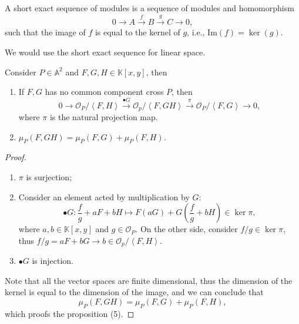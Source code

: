 \documentclass[10pt]{article}
\begin{document}
\begin{definition}
  A short exact sequence of modules is a sequence of modules and homomorphism
  \begin{equation*}
    0 \rightarrow A \xrightarrow{f} B \xrightarrow{g} C \rightarrow 0,
  \end{equation*}
  such that the image of $ f$ is equal to the kernel of $ g$, i.e., $ \mathrm{Im}(f) = \ker(g)$.
\end{definition}
We would use the short exact sequence for linear space.
\begin{definition}
  Consider $ P \in \mathbb{A}^{2}$ and $ F, G, H \in \mathbb{K}[x,y]$, then
  \begin{enumerate}[(1)]
    \item If $ F, G$ has no common component cross $ P$, then
      \begin{equation*}
        0 \rightarrow \mathcal{O}_{P}/\left< F,H \right> \xrightarrow{\bullet G} \mathcal{O}_{p}/\left< F, GH \right> \xrightarrow{\pi} \mathcal{O}_{P}/\left< F,G \right> \rightarrow 0,
      \end{equation*}
      where $ \pi$ is the natural projection map.
    \item $ \mu_{P}(F, GH) = \mu_{P}(F,G) + \mu_{P}(F,H)$.
  \end{enumerate}
\end{definition}
\begin{proof}
  \begin{enumerate}[(1)]
    \item $ \pi$ is surjection;
    \item Consider an element acted by multiplication by $ G$:
      \begin{equation*}
        \bullet G: \frac{f}{g} + a F + b H \mapsto F(a G) + G\left( \frac{f}{g} + b H \right) \in \ker{\pi},
      \end{equation*}
      where $ a, b \in \mathbb{K}[x,y]$ and $ g \in \mathcal{O}_{P}$. On the other side, consider $ f/g \in \ker{\pi}$, thus $ f / g = a F + b G \rightarrow b \in \mathcal{O}_{p} / \left< F,H \right>$.
    \item $\bullet G$ is injection.
  \end{enumerate}
  Note that all the vector spaces are finite dimensional, thus the dimension of the kernel is equal to the dimension of the image, and we can conclude that
  \begin{equation*}
    \mu_{P}(F, G H) = \mu_{P}(F,G) + \mu_{P}(F,H),
  \end{equation*}
  which proofs the proposition (5).
\end{proof}
\end{document}
